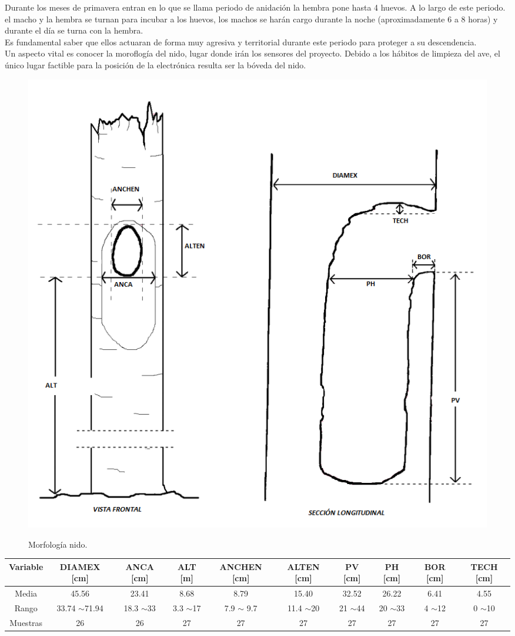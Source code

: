 Durante los meses de primavera entran en lo que se llama periodo de anidación la hembra pone hasta 4 huevos. A lo largo de este periodo. el macho y la hembra se turnan para incubar a los huevos, los machos se harán cargo durante la noche (aproximadamente 6 a 8 horas) y durante el día se turna con la hembra. \\
Es fundamental saber que ellos actuaran de forma muy agresiva y territorial durante este periodo para proteger a su descendencia. \\
Un aspecto vital es conocer la moroflogía del nido, lugar donde irán los sensores del proyecto.
Debido a los hábitos de limpieza del ave, el único lugar factible para la posición de la electrónica resulta ser la bóveda del nido. 
\begin{figure}[H]
	\centering
	\includegraphics[width=0.7\linewidth]{ImagenesIntroduccion/morfologia_nido}
	\label{fig:morfología_nido}
	\caption{Morfología nido.}
\end{figure}
\begin{table}[H]
\centering
\begin{tabular}{|c|c|c|c|c|c|c|c|c|c|}
\hline
Variable & DIAMEX {[}cm{]}   & ANCA {[}cm{]} & ALT {[}m{]}  & ANCHEN {[}cm{]} & ALTEN {[}cm{]} & PV {[}cm{]} & PH {[}cm{]} & BOR {[}cm{]} & TECH {[}cm{]} \\ \hline
Media    & 45.56             & 23.41         & 8.68         & 8.79            & 15.40          & 32.52       & 26.22       & 6.41         & 4.55          \\ \hline
Rango    & 33.74 $\sim$71.94 & 18.3 $\sim$33 & 3.3 $\sim$17 & 7.9 $\sim$ 9.7  & 11.4 $\sim$20  & 21 $\sim$44 & 20 $\sim$33 & 4 $\sim$12   & 0 $\sim$10    \\ \hline
Muestras & 26                & 26            & 27           & 27              & 27             & 27          & 27          & 27           & 27            \\ \hline
\end{tabular}
\end{table}



